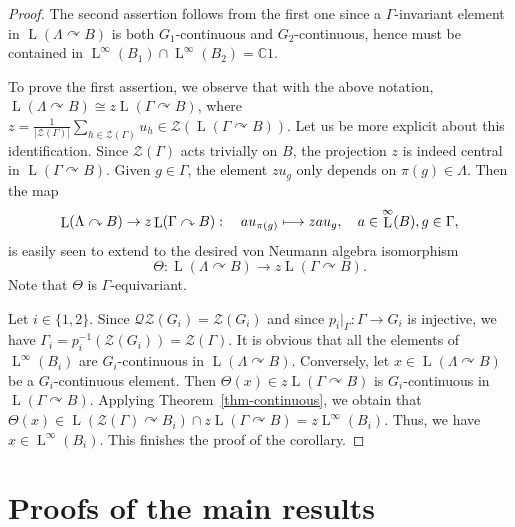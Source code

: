 \documentclass[11pt]{article}
\newcommand\mto{\mathchoice{\longmapsto}{\mapsto}{\mapsto}{\mapsto}}
\theoremstyle{definition}
\newcommand{\C}{\mathbb{C}}
\DeclareMathOperator{\rL}{L}
\begin{document}
\begin{proof}
The second assertion follows from the first one since a $\Gamma$-invariant element in $\rL(\Lambda \curvearrowright B)$ is both $G_1$-continuous and $G_2$-continuous, hence must be contained in $\rL^\infty(B_1) \cap \rL^\infty(B_2) = \C 1$.

To prove the first assertion, we observe that with the above notation, $\rL(\Lambda \curvearrowright B) \cong z \rL(\Gamma \curvearrowright B)$, where $z = \frac{1}{|\mathscr Z(\Gamma)|} \sum_{h \in \mathscr Z(\Gamma)} u_h \in \mathscr Z(\rL(\Gamma \curvearrowright B))$. Let us be more explicit about this identification. Since $\mathscr Z(\Gamma)$ acts trivially on $B$, the projection $z$ is indeed central in $\rL(\Gamma \curvearrowright B)$. Given $g \in \Gamma$, the element $zu_g$ only depends on $\pi(g) \in \Lambda$. Then the map
\[
\rL(\Lambda \curvearrowright B) \to z\rL(\Gamma \curvearrowright B) : \quad a u_{\pi(g)} \mto zau_g, \quad a \in \rL^\infty(B), g \in \Gamma,
\]
is easily seen to extend to the desired von Neumann algebra isomorphism \[
\Theta : \rL(\Lambda \curvearrowright B) \to z\rL(\Gamma \curvearrowright B).
\]
Note that $\Theta$ is $\Gamma$-equivariant.

Let $i \in \{1,2\}$. Since $\mathscr{Q}\mathscr{Z}(G_i) = \mathscr Z(G_i)$ and since $p_i|_\Gamma : \Gamma \to G_i$ is injective, we have $\Gamma_i = p_i^{-1}( \mathscr Z(G_i)) = \mathscr Z(\Gamma)$. It is obvious that all the elements of $\rL^\infty(B_i)$ are $G_i$\nobreakdash-con\-tinuous in $\rL(\Lambda \curvearrowright B)$. Conversely, let $x \in \rL(\Lambda \curvearrowright B)$ be a $G_i$-continuous element. Then $\Theta(x) \in z\rL(\Gamma \curvearrowright B)$ is $G_i$-continuous in $\rL(\Gamma \curvearrowright B)$. Applying Theorem~\ref{thm-continuous}, we obtain that $\Theta(x) \in \rL(\mathscr Z(\Gamma) \curvearrowright B_i) \cap z\rL(\Gamma \curvearrowright B) = z \rL^\infty(B_i)$. Thus, we have $x \in \rL^\infty(B_i)$. This finishes the proof of the corollary.
\end{proof}

\section{Proofs of the main results}
\end{document}
